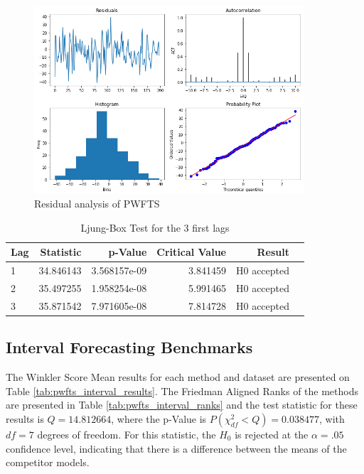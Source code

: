 \begin{figure}[h]
    \centering
    \includegraphics[width=\textwidth,height=7cm]{figures/pwfts_residual.png}
    \caption{Residual analysis of PWFTS}
    \label{fig:pwfts_residual}
\end{figure}

\begin{table}[htb]
    \centering
\begin{tabular}{lrrrrl}
\toprule
Lag &  Statistic &       p-Value &  Critical Value &       Result \\
\midrule
1 &  34.846143 &  3.568157e-09 &        3.841459 &  H0 accepted \\
2 &  35.497255 &  1.958254e-08 &        5.991465 &  H0 accepted \\
3 &  35.871542 &  7.971605e-08 &        7.814728 &  H0 accepted \\
\bottomrule
\end{tabular}
    \caption{Ljung-Box Test for the 3 first lags}
    \label{tab:pwfts_residual}
\end{table}

\subsection{Interval Forecasting Benchmarks}
\label{sec:pwfts_experiments_interval}

The Winkler Score Mean results for each method and dataset are presented on Table \ref{tab:pwfts_interval_results}. The Friedman Aligned Ranks of the methods are presented in Table \ref{tab:pwfts_interval_ranks} and the test statistic for these results is $Q = 14.812664$, where the p-Value is $P(\chi^2_{df} < Q) = 0.038477$, with $df=7$ degrees of freedom. For this statistic, the $H_0$ is rejected at the $\alpha=.05$ confidence level, indicating that there is a difference between the means of the competitor models.

